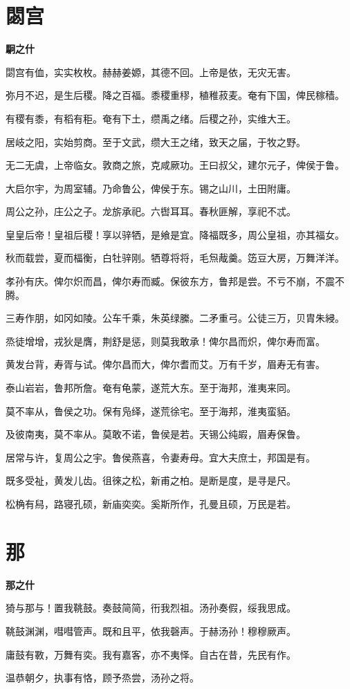 \documentclass[12pt,a4paper]{ctexbook}
\begin{document}
\section{閟宫}
\textbf{駉之什}\par\vspace{0.5em}
閟宫有侐，实实枚枚。赫赫姜嫄，其德不回。上帝是依，无灾无害。\par
弥月不迟，是生后稷。降之百福。黍稷重穋，稙稚菽麦。奄有下国，俾民稼穑。\par
有稷有黍，有稻有秬。奄有下土，缵禹之绪。后稷之孙，实维大王。\par
居岐之阳，实始剪商。至于文武，缵大王之绪，致天之届，于牧之野。\par
无二无虞，上帝临女。敦商之旅，克咸厥功。王曰叔父，建尔元子，俾侯于鲁。\par
大启尔宇，为周室辅。乃命鲁公，俾侯于东。锡之山川，土田附庸。\par
周公之孙，庄公之子。龙旂承祀。六辔耳耳。春秋匪解，享祀不忒。\par
皇皇后帝！皇祖后稷！享以骍牺，是飨是宜。降福既多，周公皇祖，亦其福女。\par
秋而载尝，夏而楅衡，白牡骍刚。牺尊将将，毛炰胾羹。笾豆大房，万舞洋洋。\par
孝孙有庆。俾尔炽而昌，俾尔寿而臧。保彼东方，鲁邦是尝。不亏不崩，不震不腾。\par
三寿作朋，如冈如陵。公车千乘，朱英绿縢。二矛重弓。公徒三万，贝胄朱綅。\par
烝徒增增，戎狄是膺，荆舒是惩，则莫我敢承！俾尔昌而炽，俾尔寿而富。\par
黄发台背，寿胥与试。俾尔昌而大，俾尔耆而艾。万有千岁，眉寿无有害。\par
泰山岩岩，鲁邦所詹。奄有龟蒙，遂荒大东。至于海邦，淮夷来同。\par
莫不率从，鲁侯之功。保有凫绎，遂荒徐宅。至于海邦，淮夷蛮貊。\par
及彼南夷，莫不率从。莫敢不诺，鲁侯是若。天锡公纯嘏，眉寿保鲁。\par
居常与许，复周公之宇。鲁侯燕喜，令妻寿母。宜大夫庶士，邦国是有。\par
既多受祉，黄发儿齿。徂徠之松，新甫之柏。是断是度，是寻是尺。\par
松桷有舄，路寝孔硕，新庙奕奕。奚斯所作，孔曼且硕，万民是若。\par

\section{那}
\textbf{那之什}\par\vspace{0.5em}
猗与那与！置我鞉鼓。奏鼓简简，衎我烈祖。汤孙奏假，绥我思成。\par
鞉鼓渊渊，嘒嘒管声。既和且平，依我磬声。于赫汤孙！穆穆厥声。\par
庸鼓有斁，万舞有奕。我有嘉客，亦不夷怿。自古在昔，先民有作。\par
温恭朝夕，执事有恪，顾予烝尝，汤孙之将。\par
\end{document}
